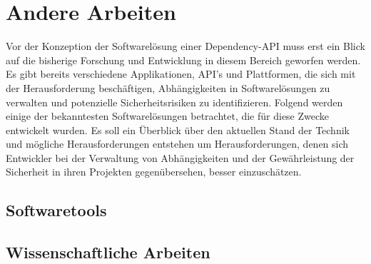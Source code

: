 \section{Andere Arbeiten} \label{sec:Andere}
    Vor der Konzeption der Softwarelösung einer Dependency-API muss erst ein Blick auf die bisherige Forschung und Entwicklung in diesem Bereich geworfen werden.
    Es gibt bereits verschiedene Applikationen, API's und Plattformen, die sich mit der Herausforderung beschäftigen, Abhängigkeiten in Softwarelösungen zu verwalten und potenzielle Sicherheitsrisiken zu identifizieren.
    Folgend werden einige der bekanntesten Softwarelösungen betrachtet, die für diese Zwecke entwickelt wurden.
    Es soll ein Überblick über den aktuellen Stand der Technik und mögliche Herausforderungen entstehen um Herausforderungen, denen sich Entwickler bei der Verwaltung von Abhängigkeiten und der Gewährleistung der Sicherheit in ihren Projekten gegenübersehen, besser einzuschätzen.
    \subsection{Softwaretools} \label{subsec:Softwaretools}
    
    
    
    
    \subsection{Wissenschaftliche Arbeiten} \label{subsec:Wiss_Arbeiten}
    
    
    